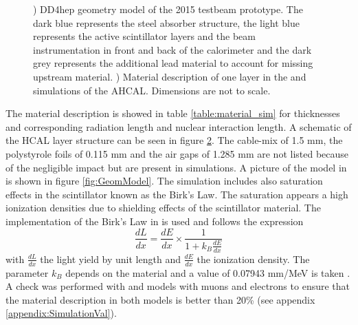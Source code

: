 \begin{figure}[htbp!]
\begin{subfigure}[t]{0.39\textwidth}
    \caption{} \label{fig:material_layout}
  \end{subfigure}
  \caption{) DD4hep geometry model of the 2015 testbeam prototype. The dark blue represents the steel absorber structure, the light blue represents the active scintillator layers and the beam instrumentation in front and back of the calorimeter and the dark grey represents the additional lead material to account for missing upstream material. ) Material description of one layer in the \mokka and \ddhep simulations of the AHCAL. Dimensions are not to scale.}
\end{figure}

The material description is showed in table \ref{table:material_sim} for thicknesses and corresponding radiation length and nuclear interaction length. A schematic of the HCAL layer structure can be seen in figure \ref{fig:material_layout}. The cable-mix of 1.5 mm, the polystyrole foils of 0.115 mm and the air gaps of 1.285 mm are not listed because of the negligible impact but are present in simulations. A picture of the model in \ddhep is shown in figure \ref{fig:GeomModel}. The simulation includes also saturation effects in the scintillator known as the Birk's Law. The saturation appears a high ionization densities due to shielding effects of the scintillator material. The implementation of the Birk's Law in \geant is used and follows the expression
\begin{equation}
  \frac{dL}{dx} = \frac{dE}{dx} \times \frac{1}{1 + k_B \frac{dE}{dx}}
\end{equation}
with $\frac{dL}{dx}$ the light yield by unit length and $\frac{dE}{dx}$ the ionization density. The parameter $k_B$ depends on the material and a value of 0.07943 mm/MeV is taken \cite{kB:IEEE}.
A check was performed with \mokka and \ddhep models with muons and electrons to ensure that the material description in both models is better than 20\% (see appendix \ref{appendix:SimulationVal}).
